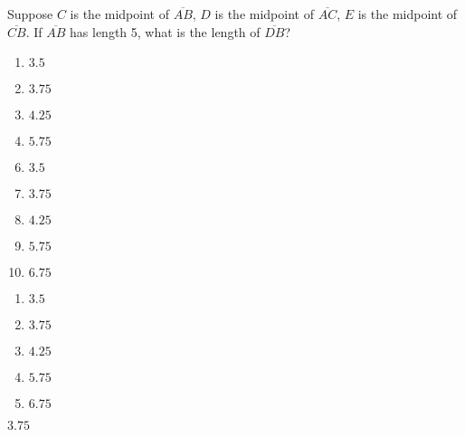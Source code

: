 

  Suppose $C$ is the midpoint of $\overline{AB}$, $D$ is the midpoint of $\overline{AC}$, $E$ is the midpoint of $\overline{CB}$.  If  $\overline{AB}$ has length 5, what is the length of $\overline{DB}$?\\


\ifsat
	\begin{enumerate}[label=\Alph*)]
		\item  $3.5$
		\item  $3.75$%
		\item  $4.25$
		\item  $5.75$
	\end{enumerate}
\else
\fi

\ifacteven
	\begin{enumerate}[label=\textbf{\Alph*.},itemsep=\fill,align=left]
		\setcounter{enumii}{5}
		\item  $3.5$
		\item  $3.75$%
		\item  $4.25$
		\addtocounter{enumii}{1}
		\item  $5.75$
		\item $6.75$
	\end{enumerate}
\else
\fi

\ifactodd
	\begin{enumerate}[label=\textbf{\Alph*.},itemsep=\fill,align=left]
		\item  $3.5$
		\item  $3.75$%
		\item  $4.25$
		\item  $5.75$
		\item $6.75$
	\end{enumerate}
\else
\fi

\ifgridin
  $3.75$%
		
\else
\fi


